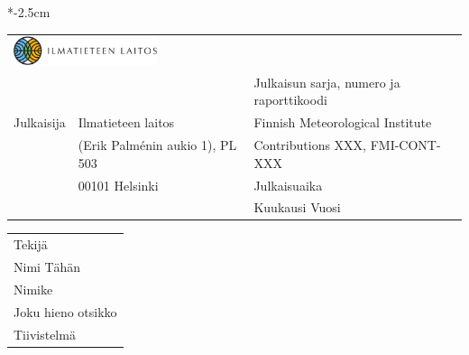 \documentclass[11pt,b5paper]{book}
\newenvironment{changemargin}[3]{%
\begin{list}{}{
\setlength{\topsep}{0pt}
\setlength{\leftmargin}{#1}
\setlength{\rightmargin}{#2}
\setlength{\listparindent}{\parindent}
\setlength{\itemindent}{\parindent}
\setlength{\parsep}{\parskip}
}
\item[]}{\end{list}}
\begin{document}
\begin{changemargin}{-5mm}{-9mm}

\vspace*{-2.5cm}

\footnotesize

\begin{flushleft}
\begin{tabular}{@{}p{2cm} p{47mm} l}
  \multicolumn{2}{l}{\hspace{-6mm} \includegraphics[width=42mm]{images/fin_cmyk.pdf}} & \\ 
  & & {\scriptsize Julkaisun sarja, numero ja raporttikoodi} \\
  \hspace{-5mm} Julkaisija & \hspace{-7mm}Ilmatieteen laitos & Finnish Meteorological Institute \\
  & \hspace{-7mm}(Erik Palm\'enin aukio 1), PL 503 & Contributions XXX, FMI-CONT-XXX \\
  & \hspace{-7mm}00101 Helsinki & {\scriptsize Julkaisuaika} \\
  & & Kuukausi Vuosi \\
\end{tabular}
\end{flushleft}

\begin{flushleft}
\begin{tabular}{p{140mm}}
  \hline
  {\scriptsize Tekijä} \\
  Nimi Tähän \\
  \hline
  {\scriptsize Nimike} \\
  Joku hieno otsikko\\
  \hline
  {\scriptsize Tiivistelmä} \\
\end{tabular}
\end{flushleft}


\end{changemargin}
\end{document}

